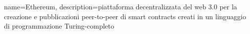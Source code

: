 {
	name={Ethereum},
	description={piattaforma decentralizzata del web 3.0 per la creazione e pubblicazioni peer-to-peer di smart contracts creati in un linguaggio di programmazione Turing-completo}
}